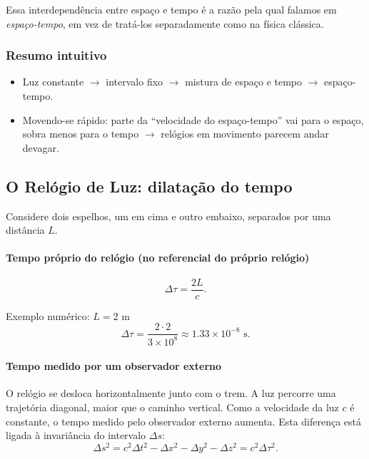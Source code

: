 \documentclass[12pt,a4paper]{article}
\begin{document}
Essa interdependência entre espaço e tempo é a razão pela qual falamos em \emph{espaço-tempo}, em vez de tratá-los separadamente como na física clássica.

\subsubsection*{Resumo intuitivo}
\begin{itemize}
    \item Luz constante $\rightarrow$ intervalo fixo $\rightarrow$ mistura de espaço e tempo $\rightarrow$ espaço-tempo.
    \item Movendo-se rápido: parte da “velocidade do espaço-tempo” vai para o espaço, sobra menos para o tempo $\rightarrow$ relógios em movimento parecem andar devagar.
\end{itemize}

\subsection{O Relógio de Luz: dilatação do tempo}

Considere dois espelhos, um em cima e outro embaixo, separados por uma distância $L$.

\paragraph{Tempo próprio do relógio (no referencial do próprio relógio)} 
\begin{equation}
    \Delta \tau = \frac{2L}{c}.
\end{equation}

Exemplo numérico: $L = 2$ m
\begin{equation}
    \Delta \tau = \frac{2 \cdot 2}{3\times10^8} \approx 1.33 \times 10^{-8}\text{ s}.
\end{equation}

\paragraph{Tempo medido por um observador externo}  
O relógio se desloca horizontalmente junto com o trem. A luz percorre uma trajetória diagonal, maior que o caminho vertical. Como a velocidade da luz $c$ é constante, o tempo medido pelo observador externo aumenta. Esta diferença está ligada à invariância do intervalo $\Delta s$:
\begin{equation}
    \Delta s^2 = c^2 \Delta t^2 - \Delta x^2 - \Delta y^2 - \Delta z^2 = c^2 \Delta \tau^2.
\end{equation}
\end{document}
